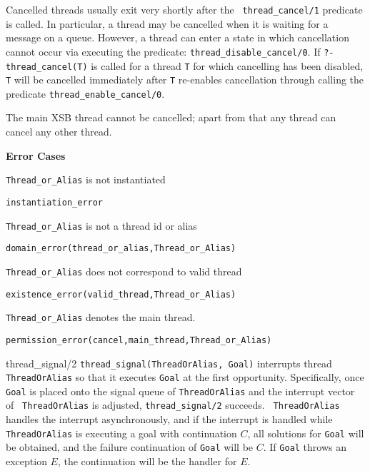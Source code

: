 \begin{description}
Cancelled threads usually exit very shortly after the {\tt
  thread\_cancel/1} predicate is called.  In particular, a thread may
be cancelled when it is waiting for a message on a queue.  However, a
thread can enter a state in which cancellation cannot occur via
executing the predicate: {\tt thread\_disable\_cancel/0}.  If {\tt ?-
  thread\_cancel(T)} is called for a thread {\tt T} for which
cancelling has been disabled, {\tt T} will be cancelled immediately
after {\tt T} re-enables cancellation through calling the predicate
{\tt thread\_enable\_cancel/0}.

The main XSB thread cannot be cancelled; apart from that any thread
can cancel any other thread.

{\bf Error Cases}
\bi
\item 	{\tt Thread\_or\_Alias} is not instantiated
\bi
\item 	{\tt instantiation\_error}
\ei
%
\item 	{\tt Thread\_or\_Alias} is not a thread id or alias
\bi
\item 	{\tt domain\_error(thread\_or\_alias,Thread\_or\_Alias)}
\ei
%
\item   {\tt Thread\_or\_Alias} does not correspond to valid thread
\bi
\item   {\tt existence\_error(valid\_thread,Thread\_or\_Alias)}
\ei
\item   {\tt Thread\_or\_Alias} denotes the main thread.
\bi
\item   {\tt permission\_error(cancel,main\_thread,Thread\_or\_Alias)}
\ei
\ei

{thread\_signal/2}
% 
{\tt thread\_signal(ThreadOrAlias, Goal)} interrupts thread {\tt
  ThreadOrAlias} so that it executes {\tt Goal} at the first
opportunity.  Specifically, once {\tt Goal} is placed onto the signal
queue of {\tt ThreadOrAlias} and the interrupt vector of {\tt
  ThreadOrAlias} is adjusted, {\tt thread\_signal/2} succeeds.  {\tt
  ThreadOrAlias} handles the interrupt asynchronously, and if the
interrupt is handled while {\tt ThreadOrAlias} is executing a goal
with continuation $C$, all solutions for {\tt Goal} will be obtained,
and the failure continuation of {\tt Goal} will be $C$.  If {\tt Goal}
throws an exception $E$, the continuation will be the handler for $E$.


\end{description}
